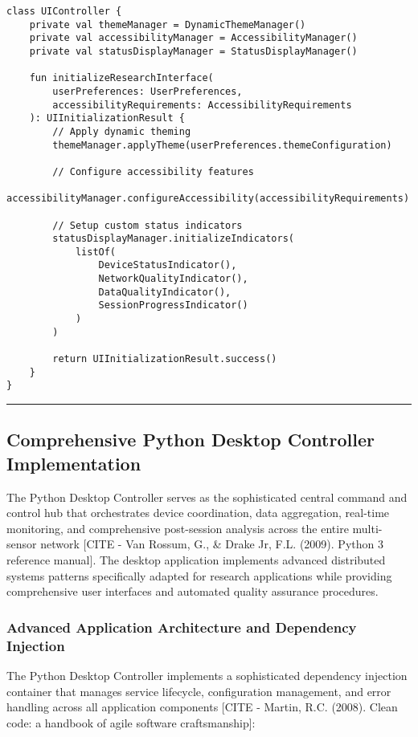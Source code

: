 \documentclass[11pt,a4paper]{report}
\begin{document}
\begin{verbatim}
class UIController {
    private val themeManager = DynamicThemeManager()
    private val accessibilityManager = AccessibilityManager()
    private val statusDisplayManager = StatusDisplayManager()

    fun initializeResearchInterface(
        userPreferences: UserPreferences,
        accessibilityRequirements: AccessibilityRequirements
    ): UIInitializationResult {
        // Apply dynamic theming
        themeManager.applyTheme(userPreferences.themeConfiguration)

        // Configure accessibility features
        accessibilityManager.configureAccessibility(accessibilityRequirements)

        // Setup custom status indicators
        statusDisplayManager.initializeIndicators(
            listOf(
                DeviceStatusIndicator(),
                NetworkQualityIndicator(),
                DataQualityIndicator(),
                SessionProgressIndicator()
            )
        )

        return UIInitializationResult.success()
    }
}
\end{verbatim}

\hrule

\subsection{Comprehensive Python Desktop Controller Implementation}

The Python Desktop Controller serves as the sophisticated central command and control hub that orchestrates device
coordination, data aggregation, real-time monitoring, and comprehensive post-session analysis across the entire
multi-sensor network [CITE - Van Rossum, G., \& Drake Jr, F.L. (2009). Python 3 reference manual]. The desktop
application implements advanced distributed systems patterns specifically adapted for research applications while
providing comprehensive user interfaces and automated quality assurance procedures.

\subsubsection{Advanced Application Architecture and Dependency Injection}

The Python Desktop Controller implements a sophisticated dependency injection container that manages service lifecycle,
configuration management, and error handling across all application
components [CITE - Martin, R.C. (2008). Clean code: a handbook of agile software craftsmanship]:
\end{document}
